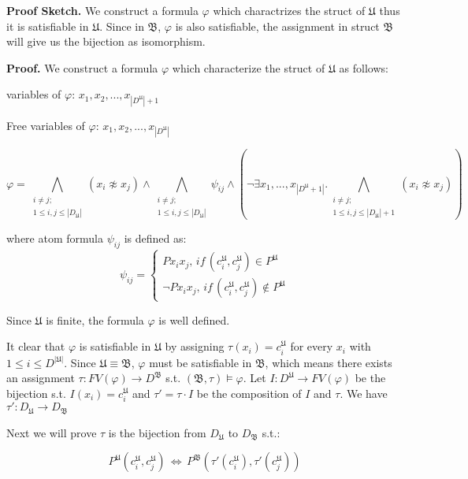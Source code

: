 \documentclass[12pt]{article}
\renewcommand{\phi}{\varphi}
\begin{document}
\begin{enumerate}
		\textbf{Proof Sketch.} We construct a formula $\phi$ which charactrizes the struct of $\mathfrak{U}$ thus it is satisfiable in $\mathfrak{U}$. Since in $\mathfrak{B}$, $\phi$  is also satisfiable, the assignment in struct $\mathfrak{B}$ will give us the bijection as isomorphism.
		
		\textbf{Proof.} We construct a formula $\phi$ which characterize the struct of $\mathfrak{U}$ as follows:
		
		variables of $\phi$: $x_1,x_2,...,x_{|D^\mathfrak{U}|+1}$
		
		Free variables of $\phi$: $x_1,x_2,...,x_{|D^\mathfrak{U}|}$
		
		$$
	\phi=\bigwedge_{\substack{i\neq j;\\1\le i,j\le|D_\mathfrak{U}|}}(x_i\not \approx x_j)\wedge \bigwedge_{\substack{i\neq j;\\1\le i,j\le|D_\mathfrak{U}|}}\psi_{ij} \wedge (\neg \exists x_1,...,x_{|D^\mathfrak{U}+1|}. \bigwedge_{{\substack{i\neq j;\\1\le i,j\le|D_\mathfrak{U}|+1}}}(x_i\not \approx x_j))
		$$

  where atom formula $\psi_{ij}$ is defined as:
  $$\psi_{ij}=
  \begin{cases}
  	Px_ix_j, \,if\,(c^{\mathfrak{U}}_i,c^{\mathfrak{U}}_j)\in P^{\mathfrak{U}}\\
  	\neg	Px_ix_j, \,if\,(c^{\mathfrak{U}}_i,c^{\mathfrak{U}}_j)\not \in P^{\mathfrak{U}}
  \end{cases}		
  $$
  
  Since $\mathfrak{U}$ is finite, the formula $\phi$ is well defined.
  
  It clear that $\phi$ is satisfiable in $\mathfrak{U}$ by assigning $\tau(x_i)=c_i^{\mathfrak{U}}$ for every $x_i$ with $1\le i\le D^{|\mathfrak{U}|}$. Since $\mathfrak{U}\equiv\mathfrak{B}$, $\phi$ must be satisfiable in $\mathfrak{B}$, which means there exists an assignment $\tau: FV(\phi)\to D^{\mathfrak{B}}$ s.t. $(\mathfrak{B},\tau)\models\phi$. Let $I:D^{\mathfrak{U}}\to FV(\phi)$ be the bijection s.t. $I(x_i)=c^{\mathfrak{U}}_i$ and  $\tau'= \tau\cdot I$ be the composition of $I$ and $\tau$. We have $\tau':D_{\mathfrak{U}}\to D_{\mathfrak{B}}$
  
  
  Next we will prove $\tau$ is the bijection from $D_{\mathfrak{U}}$ to $D_{\mathfrak{B}}$ s.t.:
  
  $$P^{\mathfrak{U}}(c_i^{\mathfrak{U}},c_j^{\mathfrak{U}})\,\Leftrightarrow\,P^{\mathfrak{B}}(\tau'(c_i^{\mathfrak{U}}),\tau'(c_j^{\mathfrak{U}}))$$
  

\end{enumerate}
\end{document}
